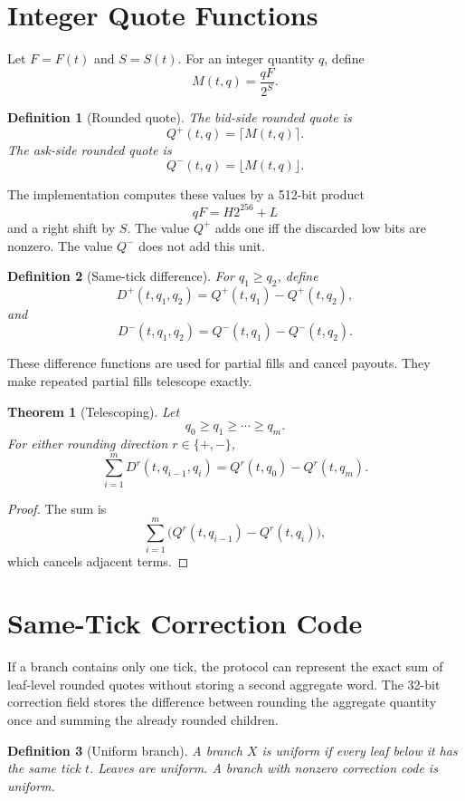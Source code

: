 \documentclass[11pt]{article}
\newtheorem{definition}{Definition}
\newtheorem{theorem}{Theorem}
\begin{document}
\section{Integer Quote Functions}

Let \(F=F(t)\) and \(S=S(t)\).  For an integer quantity \(q\), define
\[
  M(t,q) = \frac{qF}{2^S}.
\]

\begin{definition}[Rounded quote]
The bid-side rounded quote is
\[
  Q^{+}(t,q)=\lceil M(t,q)\rceil .
\]
The ask-side rounded quote is
\[
  Q^{-}(t,q)=\lfloor M(t,q)\rfloor .
\]
\end{definition}

The implementation computes these values by a 512-bit product
\[
  qF = H2^{256}+L
\]
and a right shift by \(S\).  The value \(Q^{+}\) adds one iff the
discarded low bits are nonzero.  The value \(Q^{-}\) does not add this
unit.

\begin{definition}[Same-tick difference]
For \(q_1\ge q_2\), define
\[
  D^{+}(t,q_1,q_2)=Q^{+}(t,q_1)-Q^{+}(t,q_2),
\]
and
\[
  D^{-}(t,q_1,q_2)=Q^{-}(t,q_1)-Q^{-}(t,q_2).
\]
\end{definition}

These difference functions are used for partial fills and cancel
payouts.  They make repeated partial fills telescope exactly.

\begin{theorem}[Telescoping]
Let
\[
  q_0 \ge q_1 \ge \cdots \ge q_m .
\]
For either rounding direction \(r\in\{+,-\}\),
\[
  \sum_{i=1}^{m} D^{r}(t,q_{i-1},q_i)
    = Q^{r}(t,q_0)-Q^{r}(t,q_m).
\]
\end{theorem}

\begin{proof}
The sum is
\[
  \sum_{i=1}^{m}\bigl(Q^{r}(t,q_{i-1})-Q^{r}(t,q_i)\bigr),
\]
which cancels adjacent terms.
\end{proof}

\section{Same-Tick Correction Code}

If a branch contains only one tick, the protocol can represent the exact
sum of leaf-level rounded quotes without storing a second aggregate
word.  The 32-bit correction field stores the difference between
rounding the aggregate quantity once and summing the already rounded
children.

\begin{definition}[Uniform branch]
A branch \(X\) is uniform if every leaf below it has the same tick
\(t\).  Leaves are uniform.  A branch with nonzero correction code is
uniform.
\end{definition}
\end{document}
